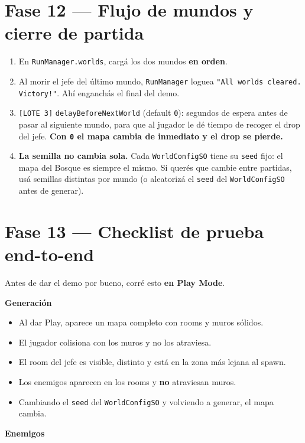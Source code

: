 \documentclass[a4paper,12pt]{article}
\newcommand{\code}[1]{\texttt{#1}}
\begin{document}
\section{Fase 12 --- Flujo de mundos y cierre de partida}

\begin{enumerate}
    \item En \code{RunManager.worlds}, cargá los dos mundos \textbf{en orden}.
    \item Al morir el jefe del último mundo, \code{RunManager} loguea
    \code{"All worlds cleared. Victory!"}. Ahí enganchás el final del demo.
    \item \code{[LOTE 3]} \code{delayBeforeNextWorld} (default \code{0}): segundos de espera antes
    de pasar al siguiente mundo, para que al jugador le dé tiempo de recoger el drop del jefe.
    \textbf{Con \code{0} el mapa cambia de inmediato y el drop se pierde.}
    \item \textbf{La semilla no cambia sola.} Cada \code{WorldConfigSO} tiene su \code{seed} fijo:
    el mapa del Bosque es siempre el mismo. Si querés que cambie entre partidas, usá semillas
    distintas por mundo (o aleatorizá el \code{seed} del \code{WorldConfigSO} antes de generar).
\end{enumerate}

\section{Fase 13 --- Checklist de prueba end-to-end}

Antes de dar el demo por bueno, corré esto \textbf{en Play Mode}.

\textbf{Generación}

\begin{itemize}[label=$\square$]
    \item Al dar Play, aparece un mapa completo con rooms y muros sólidos.
    \item El jugador colisiona con los muros y no los atraviesa.
    \item El room del jefe es visible, distinto y está en la zona más lejana al spawn.
    \item Los enemigos aparecen en los rooms y \textbf{no} atraviesan muros.
    \item Cambiando el \code{seed} del \code{WorldConfigSO} y volviendo a generar, el mapa cambia.
\end{itemize}

\textbf{Enemigos}
\end{document}
